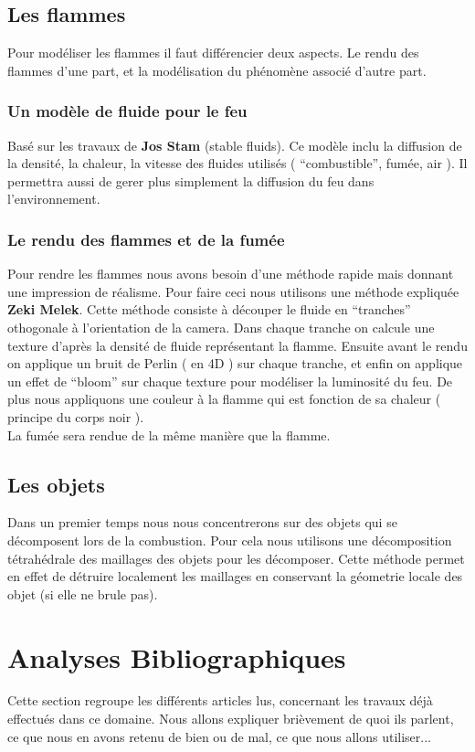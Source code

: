 \documentclass[a4paper,10pt]{article}
\begin{document}
\subsection{Les flammes}
Pour modéliser les flammes il faut différencier deux aspects. Le rendu
des flammes d'une part, et la modélisation du phénomène associé
d'autre part.

\subsubsection{Un modèle de fluide pour le feu}
Basé sur les travaux de \textbf{Jos Stam} (stable fluids). Ce modèle inclu la
diffusion de la densité, la chaleur, la vitesse des fluides utilisés (
``combustible'', fumée, air ). Il permettra aussi de gerer plus
simplement la diffusion du feu dans l'environnement.

\subsubsection{Le rendu des flammes et de la fumée}
Pour rendre les flammes nous avons besoin d'une méthode rapide mais
donnant une impression de réalisme. Pour faire ceci nous utilisons une
méthode expliquée \textbf{Zeki Melek}. Cette méthode consiste à
découper le fluide en ``tranches'' othogonale à l'orientation de la
camera. Dans chaque tranche on calcule une texture d'après la densité
de fluide représentant la flamme. Ensuite avant le rendu on applique
un bruit de Perlin ( en 4D ) sur chaque tranche, et enfin on applique
un effet de ``bloom'' sur chaque texture pour modéliser la luminosité
du feu. De plus nous appliquons une couleur à la flamme qui est fonction de 
sa chaleur ( principe du corps noir ).\\
La fumée sera rendue de la même manière que la flamme.

\subsection{Les objets}
Dans un premier temps nous nous concentrerons sur des objets qui se
décomposent lors de la combustion. Pour cela nous utilisons une
décomposition tétrahédrale des maillages des objets pour les
décomposer. Cette méthode permet en effet de détruire localement les
maillages en conservant la géometrie locale des objet (si elle ne
brule pas).



\section{Analyses Bibliographiques}
Cette section regroupe les différents articles lus, concernant les travaux déjà effectués dans ce domaine. 
Nous allons expliquer brièvement de quoi ils parlent, ce que nous en avons retenu de bien ou de mal, ce que nous allons 
utiliser...
\end{document}
